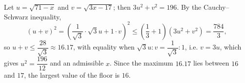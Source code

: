 Let $u=\sqrt{71-x}$ and $v=\sqrt{3x-17}$; then $3u^2+v^2=196$. By the Cauchy--Schwarz inequality,
\[(u+v)^2=\left(\dfrac{1}{\sqrt3}\cdot\sqrt3u+1\cdot v\right)^2\le\left(\dfrac13+1\right)\left(3u^2+v^2\right)=\dfrac{784}{3},\]
so $u+v\le\dfrac{28}{\sqrt3}\approx16.17$, with equality when $\sqrt3u:v=\dfrac{1}{\sqrt3}:1$, i.e. $v=3u$, which gives $u^2=\dfrac{196}{12}$ and an admissible $x$. Since the maximum $16.17$ lies between $16$ and $17$, the largest value of the floor is $\boxed{16}$.
